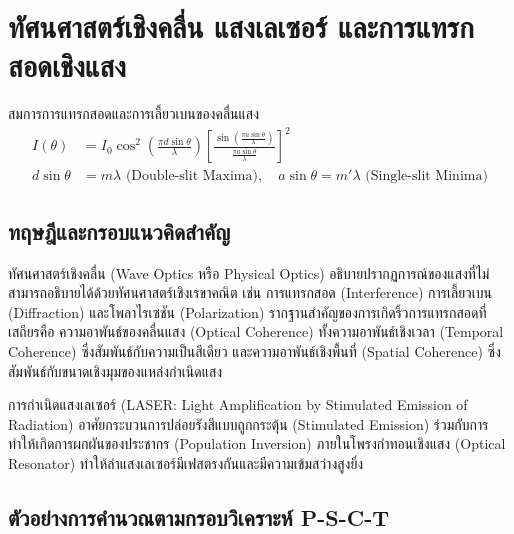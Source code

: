 
\chapter{ทัศนศาสตร์เชิงคลื่น แสงเลเซอร์ และการแทรกสอดเชิงแสง}
\label{ch:chapter05}


\vspace{0.4cm}

\begin{equationsbox}{สมการการแทรกสอดและการเลี้ยวเบนของคลื่นแสง}
\begin{align}
I(\theta) &= I_0 \cos^2\left(\frac{\pi d \sin\theta}{\lambda}\right) \left[\frac{\sin\left(\frac{\pi a \sin\theta}{\lambda}\right)}{\frac{\pi a \sin\theta}{\lambda}}\right]^2 \\
d\sin\theta &= m\lambda \text{ (Double-slit Maxima)}, \quad a\sin\theta = m'\lambda \text{ (Single-slit Minima)}
\end{align}
\end{equationsbox}

\section{ทฤษฎีและกรอบแนวคิดสำคัญ}

ทัศนศาสตร์เชิงคลื่น (Wave Optics หรือ Physical Optics) อธิบายปรากฏการณ์ของแสงที่ไม่สามารถอธิบายได้ด้วยทัศนศาสตร์เชิงเรขาคณิต เช่น การแทรกสอด (Interference) การเลี้ยวเบน (Diffraction) และโพลาไรเซชัน (Polarization) รากฐานสำคัญของการเกิดริ้วการแทรกสอดที่เสถียรคือ ความอาพันธ์ของคลื่นแสง (Optical Coherence) ทั้งความอาพันธ์เชิงเวลา (Temporal Coherence) ซึ่งสัมพันธ์กับความเป็นสีเดียว และความอาพันธ์เชิงพื้นที่ (Spatial Coherence) ซึ่งสัมพันธ์กับขนาดเชิงมุมของแหล่งกำเนิดแสง

การกำเนิดแสงเลเซอร์ (LASER: Light Amplification by Stimulated Emission of Radiation) อาศัยกระบวนการปล่อยรังสีแบบถูกกระตุ้น (Stimulated Emission) ร่วมกับการทำให้เกิดการผกผันของประชากร (Population Inversion) ภายในโพรงกำทอนเชิงแสง (Optical Resonator) ทำให้ลำแสงเลเซอร์มีเฟสตรงกันและมีความเข้มสว่างสูงยิ่ง

\section{ตัวอย่างการคำนวณตามกรอบวิเคราะห์ P-S-C-T}

